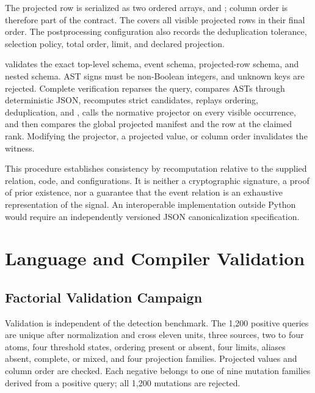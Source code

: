 The projected row is serialized as two ordered arrays,  and ; column order is therefore part of the contract. The  covers all visible projected rows in their final order. The postprocessing configuration also records the deduplication tolerance, selection policy, total order, limit, and declared projection.

 validates the exact top-level schema, event schema, projected-row schema, and nested  schema. AST signs must be non-Boolean integers, and unknown keys are rejected. Complete verification reparses the query, compares ASTs through deterministic JSON, recomputes strict candidates, replays ordering, deduplication, and , calls the normative projector on every visible occurrence, and then compares the global projected manifest and the row at the claimed rank. Modifying the projector, a projected value, or column order invalidates the witness.

This procedure establishes consistency by recomputation relative to the supplied relation, code, and configurations. It is neither a cryptographic signature, a proof of prior existence, nor a guarantee that the event relation is an exhaustive representation of the signal. An interoperable implementation outside Python would require an independently versioned JSON canonicalization specification.

\section{Language and Compiler Validation}

\subsection{Factorial Validation Campaign}

Validation is independent of the detection benchmark. The 1,200 positive queries are unique after normalization and cross eleven units, three sources, two to four atoms, four threshold states, ordering present or absent, four limits, aliases absent, complete, or mixed, and four projection families. Projected values and column order are checked. Each negative belongs to one of nine mutation families derived from a positive query; all 1,200 mutations are rejected.


